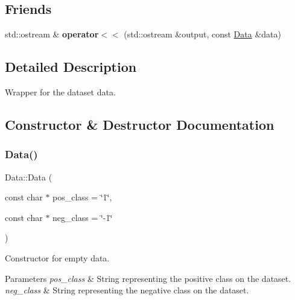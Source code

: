 \subsection*{Friends}
\begin{DoxyCompactItemize}
\item 
\mbox{\label{class_data_ae7387779a206ec9f8d282b354e0c3316}} 
std\+::ostream \& {\bfseries operator$<$$<$} (std\+::ostream \&output, const \hyperlink{class_data}{Data} \&data)
\end{DoxyCompactItemize}


\subsection{Detailed Description}
Wrapper for the dataset data. 

\subsection{Constructor \& Destructor Documentation}
\mbox{\label{class_data_aa3ca35c963eec5a4734df23f88443077}} 
\subsubsection{\texorpdfstring{Data()}{Data()}\hspace{0.1cm}{\footnotesize\ttfamily [1/2]}}
{\footnotesize\ttfamily Data\+::\+Data (\begin{DoxyParamCaption}\item[{const char $\ast$}]{pos\+\_\+class = {\ttfamily \char`\"{}1\char`\"{}},  }\item[{const char $\ast$}]{neg\+\_\+class = {\ttfamily \char`\"{}-\/1\char`\"{}} }\end{DoxyParamCaption})}



Constructor for empty data. 


\begin{DoxyParams}{Parameters}
{\em pos\+\_\+class} & String representing the positive class on the dataset. \\
\hline
{\em neg\+\_\+class} & String representing the negative class on the dataset. \\
\hline
\end{DoxyParams}
\mbox{\label{class_data_a85afba1f115dce4b6d2a952326624dd4}} 
